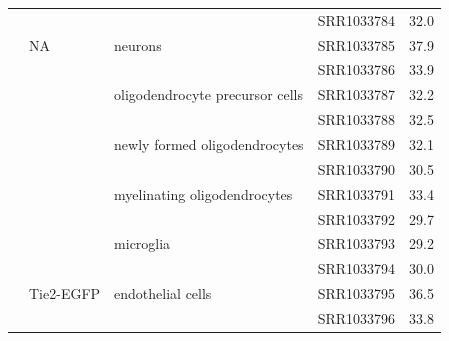 \begin{longtabu} {X[0.9,c]X[1.1,l]X[1.2,l]X[1,l]X[1,c]}
            &              &             & SRR1033784 & 32.0\\
            & NA           & neurons     & SRR1033785 & 37.9\\
            &              &             & SRR1033786 & 33.9\\
            &              & oligodendrocyte precursor cells & SRR1033787 & 32.2\\
            &              &             & SRR1033788 & 32.5\\
            &              & newly formed oligodendrocytes & SRR1033789 & 32.1\\
            &              &             & SRR1033790 & 30.5\\
            &              & myelinating oligodendrocytes & SRR1033791 & 33.4\\
            &              &             & SRR1033792 & 29.7\\
            &              & microglia   & SRR1033793 & 29.2\\
            &              &             & SRR1033794 & 30.0\\
            & Tie2-EGFP    & endothelial cells & SRR1033795 & 36.5\\
            &              &             & SRR1033796 & 33.8\\
  \bottomrule
\end{longtabu}
\pagebreak

